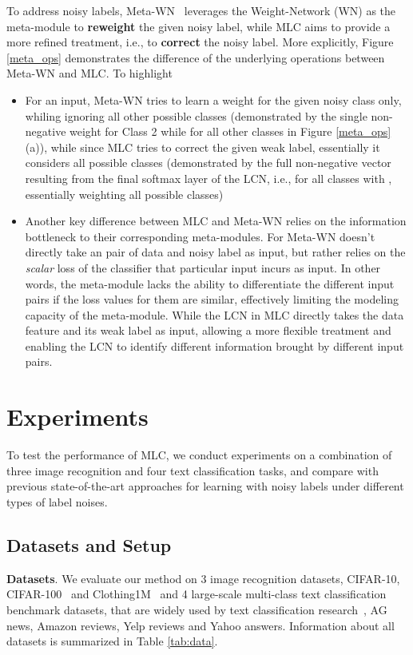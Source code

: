 To address noisy labels, Meta-WN~\cite{shu2019meta} leverages the
Weight-Network (WN) as the meta-module to \textbf{reweight} the given
noisy label, while MLC aims to provide a more refined treatment, i.e.,
to \textbf{correct} the noisy label. More explicitly, Figure
\ref{meta_ops} demonstrates the difference of the underlying
operations between Meta-WN and MLC. To highlight
\begin{itemize}
  \item For an input, Meta-WN tries to learn a weight for the given
    noisy class only, whiling ignoring all other possible classes
    (demonstrated by the single non-negative weight  for Class
    2 while  for all other classes in Figure \ref{meta_ops}(a)),
    while since MLC tries to correct the given weak label, essentially
    it considers all possible classes (demonstrated by the full
    non-negative vector resulting from the final softmax layer of the LCN,
    i.e.,  for all
    classes with ,
    essentially weighting all possible classes)
  \item Another key difference between MLC and Meta-WN relies on the
    information bottleneck to their corresponding meta-modules. For
    Meta-WN doesn't directly take an pair of data and noisy label as
    input, but rather relies on the \textit{scalar} loss of the
    classifier that particular input incurs as input. In other words,
    the meta-module lacks the ability to differentiate the different
    input pairs if the loss values for them are similar, effectively
    limiting the modeling capacity of the meta-module. While the LCN
    in MLC directly takes the data feature  and its weak
    label as input, allowing a more flexible treatment and enabling
    the LCN to identify different information brought by different
    input pairs.
  \end{itemize}




\section{Experiments}
\label{sec:exp}

To test the performance of MLC, we conduct experiments on a
combination of three image recognition and four text classification
tasks, and compare with previous state-of-the-art approaches for
learning with noisy labels under different types of label noises.

\subsection{Datasets and Setup}
\textbf{Datasets}. We evaluate our method on 3 image recognition datasets, CIFAR-10, CIFAR-100~\cite{krizhevsky2009learning} and
Clothing1M~\cite{xiao2015learning} and 4 large-scale multi-class text classification benchmark
datasets, that are widely used by text classification
research~\cite{zhang2015character, xie2019unsupervised,
  dai2019transformer, yang2016hierarchical, conneau2016very}, AG news, Amazon reviews, Yelp reviews and Yahoo
answers. Information about all datasets is summarized in Table
\ref{tab:data}.


